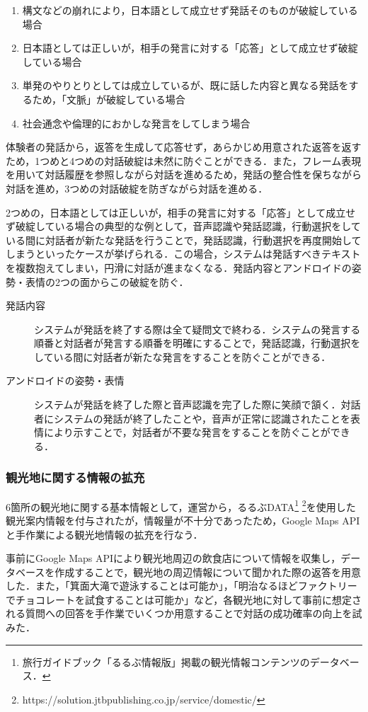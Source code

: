 \begin{enumerate}
    \item 構文などの崩れにより，日本語として成立せず発話そのものが破綻している場合
    \item 日本語としては正しいが，相手の発言に対する「応答」として成立せず破綻している場合
    \item 単発のやりとりとしては成立しているが、既に話した内容と異なる発話をするため，「文脈」が破綻している場合
    \item 社会通念や倫理的におかしな発言をしてしまう場合
\end{enumerate}

体験者の発話から，返答を生成して応答せず，あらかじめ用意された返答を返すため，1つめと4つめの対話破綻は未然に防ぐことができる．また，フレーム表現を用いて対話履歴を参照しながら対話を進めるため，発話の整合性を保ちながら対話を進め，3つめの対話破綻を防ぎながら対話を進める．

2つめの，日本語としては正しいが，相手の発言に対する「応答」として成立せず破綻している場合の典型的な例として，音声認識や発話認識，行動選択をしている間に対話者が新たな発話を行うことで，発話認識，行動選択を再度開始してしまうといったケースが挙げられる．この場合，システムは発話すべきテキストを複数抱えてしまい，円滑に対話が進まなくなる．発話内容とアンドロイドの姿勢・表情の2つの面からこの破綻を防ぐ．

\begin{description}
    \item[発話内容]
    システムが発話を終了する際は全て疑問文で終わる．システムの発言する順番と対話者が発言する順番を明確にすることで，発話認識，行動選択をしている間に対話者が新たな発言をすることを防ぐことができる．
    \item[アンドロイドの姿勢・表情]
    システムが発話を終了した際と音声認識を完了した際に笑顔で頷く．対話者にシステムの発話が終了したことや，音声が正常に認識されたことを表情により示すことで，対話者が不要な発言をすることを防ぐことができる．
\end{description}

\subsubsection{観光地に関する情報の拡充}
6箇所の観光地に関する基本情報として，運営から，るるぶDATA\footnote{旅行ガイドブック「るるぶ情報版」掲載の観光情報コンテンツのデータベース．} \footnote{https://solution.jtbpublishing.co.jp/service/domestic/}を使用した観光案内情報を付与されたが，情報量が不十分であったため，Google Maps APIと手作業による観光地情報の拡充を行なう．

事前にGoogle Maps APIにより観光地周辺の飲食店について情報を収集し，データベースを作成することで，観光地の周辺情報について聞かれた際の返答を用意した．また，「箕面大滝で遊泳することは可能か」，「明治なるほどファクトリーでチョコレートを試食することは可能か」など，各観光地に対して事前に想定される質問への回答を手作業でいくつか用意することで対話の成功確率の向上を試みた．
